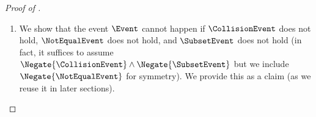 \begin{proof}[Proof of ]
\begin{enumerate}
Since the event $\CollisionEvent$ does not hold ($\ROTrace$ contains no collisions), each vertex in the tree $\MTGraph_{\MTMessageLength}$ is labeled at most once. There are at most $\min\{2\ROQueryBound_{1}+1,2\MTMessageLength\}$ non-dummy labels in $\MTGraph_{\MTMessageLength}$ (we argued this in the prior point). Moreover, $\MTGraph_{\MTMessageLength} = \hat{\MTGraph_{\MTMessageLength}}$ because $\NotEqualEvent$ does not hold. Hence there are no queries in $\ROOpenTrace \setminus \ROTrace$ that have an answer that equals a non-dummy label in $\MTGraph_{\MTMessageLength}$ (otherwise, there would be a leaf in $\hat{\MTGraph_{\MTMessageLength}}$ labeled differently from the corresponding leaf in $\MTGraph_{\MTMessageLength}$). Hence the probability that any fixed query in $\ROHonestTrace_{\MTMessageIndex}$ (that is not in $\ROTrace \cup \ROOpenTrace$) has an answer that equals a non-dummy label in $\MTGraph_{\MTMessageLength}$ is at most $\frac{\min\{2\ROQueryBound_{1}+1,2\MTMessageLength\}}{2^{\ROOutputSize}}$.

Considering any choice of $\MTMessageIndexSet \subseteq [\MTMessageLength]$ and $\MTMessageIndex \in \MTMessageIndexSet$ and taking a union bound over all queries in $\ROHonestTrace_{\MTMessageIndex}$,
\begin{align*}
\Pr\left[\SubsetEvent \ConditionedOn \Negate{\CollisionEvent} \land \Negate{\NotEqualEvent} \right]
\leq
\max_{\MTMessageIndexSet \subseteq [\MTMessageLength]}
\max_{\MTMessageIndex \in \MTMessageIndexSet}
\Cardinality{\ROHonestTrace_{\MTMessageIndex}} \cdot \frac{\min\{2\ROQueryBound_{1}+1,2\MTMessageLength\}}{2^{\ROOutputSize}}
\leq
(\MTDepth+1) \cdot \frac{\min\{2\ROQueryBound_{1}+1,2\MTMessageLength\}}{2^{\ROOutputSize}}
\enspace.
\end{align*}

  \item We show that the event $\Event$ cannot happen if $\CollisionEvent$ does not hold, $\NotEqualEvent$ does not hold, and $\SubsetEvent$ does not hold (in fact, it suffices to assume $\Negate{\CollisionEvent} \land \Negate{\SubsetEvent}$ but we include $\Negate{\NotEqualEvent}$ for symmetry). We provide this as a claim (as we reuse it in later sections).


\end{enumerate}
\end{proof}
